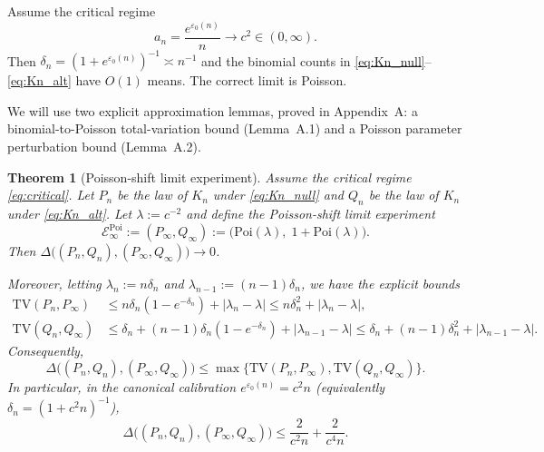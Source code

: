 \documentclass{article}
\newtheorem{theorem}{Theorem}[section]
\begin{document}
Assume the critical regime
\begin{equation}
a_n = \frac{e^{\varepsilon_0(n)}}{n} \to c^2 \in (0, \infty). \label{eq:critical}
\end{equation}
Then $\delta_n = (1 + e^{\varepsilon_0(n)})^{-1} \asymp n^{-1}$ and the binomial counts in \eqref{eq:Kn_null}--\eqref{eq:Kn_alt}
have $O(1)$ means. The correct limit is Poisson.

We will use two explicit approximation lemmas, proved in Appendix~A: a binomial-to-Poisson
total-variation bound (Lemma~A.1) and a Poisson parameter perturbation bound (Lemma~A.2).

\begin{theorem}[Poisson-shift limit experiment]
\label{thm:poisson-shift}
Assume the critical regime \eqref{eq:critical}. Let $P_n$ be the law of $K_n$ under \eqref{eq:Kn_null} and $Q_n$ be the
law of $K_n$ under \eqref{eq:Kn_alt}. Let $\lambda := c^{-2}$ and define the Poisson-shift limit experiment
\[
\mathcal{E}^{\mathrm{Poi}}_\infty := (P_\infty, Q_\infty) := \bigl(\mathrm{Poi}(\lambda),\; 1 + \mathrm{Poi}(\lambda)\bigr).
\]
Then $\Delta\bigl((P_n, Q_n), (P_\infty, Q_\infty)\bigr) \to 0$.

Moreover, letting $\lambda_n := n\delta_n$ and $\lambda_{n-1} := (n-1)\delta_n$, we have the explicit bounds
\begin{align}
\mathrm{TV}(P_n, P_\infty) &\leq n\delta_n(1 - e^{-\delta_n}) + |\lambda_n - \lambda| \leq n\delta_n^2 + |\lambda_n - \lambda|, \label{eq:TVPn}\\
\mathrm{TV}(Q_n, Q_\infty) &\leq \delta_n + (n-1)\delta_n(1 - e^{-\delta_n}) + |\lambda_{n-1} - \lambda| \leq \delta_n + (n-1)\delta_n^2 + |\lambda_{n-1} - \lambda|. \label{eq:TVQn}
\end{align}
Consequently,
\begin{equation}
\Delta\bigl((P_n, Q_n), (P_\infty, Q_\infty)\bigr) \leq \max\{\mathrm{TV}(P_n, P_\infty), \mathrm{TV}(Q_n, Q_\infty)\}. \label{eq:LeCam_bound}
\end{equation}
In particular, in the canonical calibration $e^{\varepsilon_0(n)} = c^2 n$ (equivalently $\delta_n = (1 + c^2 n)^{-1}$),
\begin{equation}
\Delta\bigl((P_n, Q_n), (P_\infty, Q_\infty)\bigr) \leq \frac{2}{c^2 n} + \frac{2}{c^4 n}. \label{eq:explicit_rate}
\end{equation}
\end{theorem}
\end{document}
